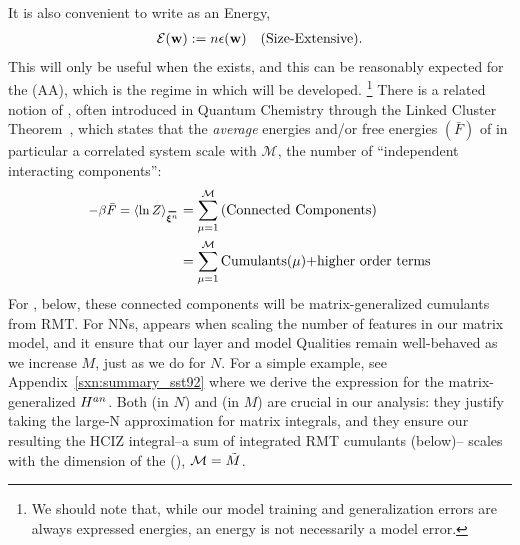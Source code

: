 It is also convenient to write \emph{\TotalEffectivePotential} as an Energy, 
\begin{align}
 \label{eqn:detox}
 \mathcal{E}(\mathbf{w}) := n\epsilon({\mathbf{w}})\quad \text{(Size-Extensive)}.
\end{align}
This will only be useful when the \ThermodynamicLimit exists, and this
can be reasonably expected for the \AnnealedApproximation (AA),
which is the regime in which \SETOL will be developed.%
\footnote{We should note that, while our model training and generalization errors are always expressed energies, an energy is not necessarily a model error. }
There is a related notion of \emph{\SizeConsistency},
often introduced in Quantum Chemistry through the Linked Cluster Theorem~\cite{Hubbard1959,Brandow1963},
which states that the \emph{average} energies and/or free energies $(\bar{F})$ of in particular a correlated system scale with $\mathcal{M}$,
the number of ``independent interacting components'':
\begin{align}
  \label{eqn:LCT}
  -\beta \bar{F}=\langle \ln Z \rangle_{\AVGNDXIn} &= \sum_{\mu=1}^{\mathcal{M}}\text{(Connected Components)} \\ \nonumber
  &= \sum_{\mu=1}^{\mathcal{M}}\text{Cumulants($\mu$)+higher order terms} 
\end{align}
For \SETOL, below, these connected components will be matrix-generalized cumulants from RMT.
For NNs, \SizeConsistency appears when scaling the number of features in our matrix model,
and it ensure that our layer and model Qualities  remain well-behaved as we increase $M$, just as we do for $N$.
For a simple example, see Appendix~\ref{sxn:summary_sst92}
 where we derive the expression for the matrix-generalized
\AnnealedHamiltonian $H^{an}$.  
Both \SizeExtensivity (in $N$) and \SizeConsistency (in $M$)
are crucial in our \SETOL analysis:  they justify taking the large-N approximation for matrix integrals, and they ensure
our resulting the HCIZ integral--a sum of integrated RMT cumulants (below)--
scales with the dimension of the \EffectiveCorrelationSpace (\ECS), $\mathcal{M}=\tilde{M}$.


